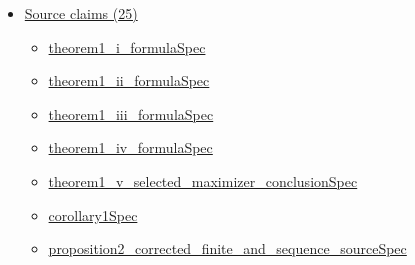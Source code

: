 \documentclass[10pt]{article}
\begin{document}
\begin{itemize}[leftmargin=1.2em]
\begin{itemize}[leftmargin=1.2em]
\item \hyperlink{library-prerequisite-da58a47f8cf8aa37}{EconCSLib.Probability.expectedOrderStatisticMeanSeq}
\item \hyperlink{library-prerequisite-c31a128535eb9d3f}{EconCSLib.Probability.topKRankEmbedding}
\item \hyperlink{library-prerequisite-73abacac3346884e}{EconCSLib.Probability.upperOrderStatistic}
\item \hyperlink{library-prerequisite-d2bd4711b013979c}{EconCSLib.Probability.sampleTopKSum}
\item \hyperlink{library-prerequisite-d84d938cdf309d75}{EconCSLib.Probability.expectedSampleTopKSum}
\item \hyperlink{library-prerequisite-b6ce97a274cbdb86}{EconCSLib.Probability.realBernoulliPMF}
\item \hyperlink{library-prerequisite-6839133042f142df}{EconCSLib.Probability.reflectedCDFMass}
\item \hyperlink{library-prerequisite-087e3287a5c76915}{EconCSLib.finiteMin}
\item \hyperlink{library-prerequisite-e5c7eedc40c11b7a}{EconCSLib.pmfExp}
\item \hyperlink{library-prerequisite-b9805c0fe3b56f02}{EconCSLib.pmfPi}
\item \hyperlink{library-prerequisite-7fec9dedef722fc8}{EconCSLib.pmfProb}
\item \hyperlink{library-prerequisite-38eb9a31a47bfbd9}{EconCSLib.pmfProduct}
\end{itemize}
\item \hyperlink{source-section-f10b5f68e4acf3dc}{Source claims (25)}
\begin{itemize}[leftmargin=1.2em]
\item \hyperlink{source-claim-f5a7e9fe26a022aa}{theorem1\_i\_formulaSpec}
\item \hyperlink{source-claim-8765a3b8d5c11957}{theorem1\_ii\_formulaSpec}
\item \hyperlink{source-claim-378eee8a78b6ada4}{theorem1\_iii\_formulaSpec}
\item \hyperlink{source-claim-cc5ff6e8390a6049}{theorem1\_iv\_formulaSpec}
\item \hyperlink{source-claim-846cffa9077c1769}{theorem1\_v\_selected\_maximizer\_conclusionSpec}
\item \hyperlink{source-claim-e7ae4618a91038ee}{corollary1Spec}
\item \hyperlink{source-claim-e58423f2214d3283}{proposition2\_corrected\_finite\_and\_sequence\_sourceSpec}

\end{itemize}
\end{itemize}
\end{document}
